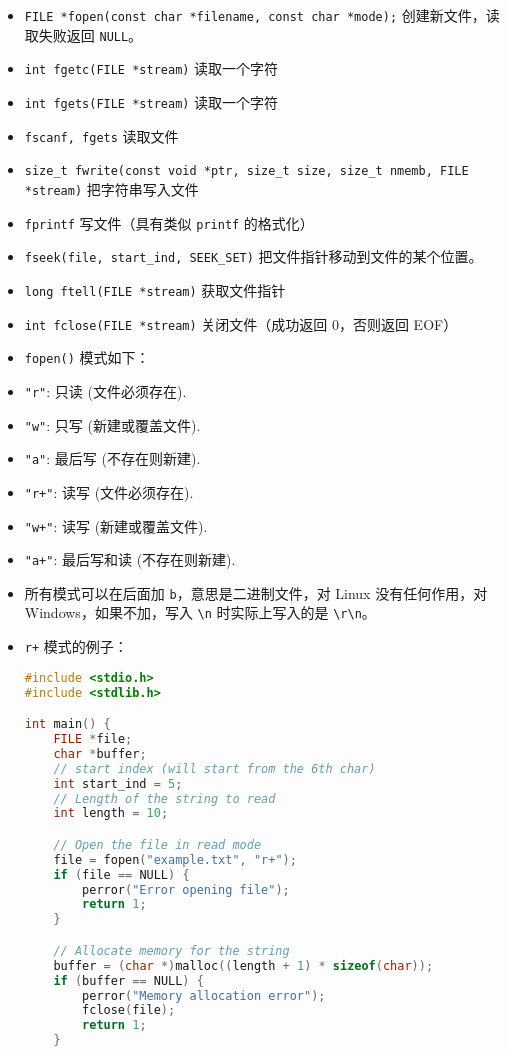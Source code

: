 
\begin{itemize}
\item \verb`FILE *fopen(const char *filename, const char *mode);` 创建新文件，读取失败返回 \verb`NULL`。
\item \verb`int fgetc(FILE *stream)` 读取一个字符
\item \verb`int fgets(FILE *stream)` 读取一个字符
\item \verb`fscanf, fgets` 读取文件
\item \verb`size_t fwrite(const void *ptr, size_t size, size_t nmemb, FILE *stream)` 把字符串写入文件
\item \verb`fprintf` 写文件（具有类似 \verb`printf` 的格式化）
\item \verb`fseek(file, start_ind, SEEK_SET)` 把文件指针移动到文件的某个位置。
\item \verb`long ftell(FILE *stream)` 获取文件指针
\item \verb`int fclose(FILE *stream)` 关闭文件（成功返回 0，否则返回 EOF）
\item \verb`fopen()` 模式如下：
\item \verb`"r"`: 只读 (文件必须存在).
\item \verb`"w"`: 只写 (新建或覆盖文件).
\item \verb`"a"`: 最后写 (不存在则新建).
\item \verb`"r+"`: 读写 (文件必须存在).
\item \verb`"w+"`: 读写 (新建或覆盖文件).
\item \verb`"a+"`: 最后写和读 (不存在则新建).
\item 所有模式可以在后面加 \verb`b`，意思是二进制文件，对 Linux 没有任何作用，对 Windows，如果不加，写入 \verb`\n` 时实际上写入的是 \verb`\r\n`。
\item \verb`r+` 模式的例子：
\begin{lstlisting}[language=cpp]
#include <stdio.h>
#include <stdlib.h>

int main() {
    FILE *file;
    char *buffer;
    // start index (will start from the 6th char)
    int start_ind = 5;
    // Length of the string to read
    int length = 10;

    // Open the file in read mode
    file = fopen("example.txt", "r+");
    if (file == NULL) {
        perror("Error opening file");
        return 1;
    }

    // Allocate memory for the string
    buffer = (char *)malloc((length + 1) * sizeof(char));
    if (buffer == NULL) {
        perror("Memory allocation error");
        fclose(file);
        return 1;
    }


\end{lstlisting}
\end{itemize}
